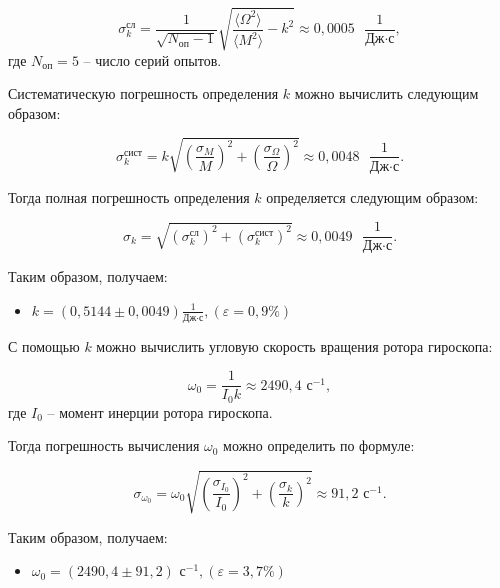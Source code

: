\documentclass[a4paper,12pt]{article} %
\begin{document}
\begin{equation}
\sigma^\text{сл}_k = \frac{1}{\sqrt{N_\text{оп}-1}} \sqrt{\frac{\langle \Omega^2 \rangle}{\langle M^2 \rangle} - k^2} \approx 0,0005 \text{ } \frac{1}{\text{Дж} \cdot \text{с}},
\end{equation}
где $ N_\text{оп} = 5 $ -- число серий опытов.

Систематическую погрешность определения $ k $ можно вычислить следующим образом:

\begin{equation}
\sigma^\text{сист}_k = k\sqrt{\left( \frac{\sigma_M}{M} \right)^2+\left(\frac{\sigma_\Omega}{\Omega} \right)^2} \approx 0,0048 \text{ } \frac{1}{\text{Дж} \cdot \text{с}}.
\end{equation}

Тогда полная погрешность определения $ k $ определяется следующим образом:

\begin{equation}
\sigma_k = \sqrt{\left( \sigma_k^\text{сл} \right)^2 + \left( \sigma_k^\text{сист} \right)^2  } \approx 0,0049 \text{ } \frac{1}{\text{Дж} \cdot \text{с}}.
\end{equation}

Таким образом, получаем:

\begin{itemize}
	\item \underline{$ k =\left( 0,5144 \pm 0,0049 \right) \frac{1}{\text{Дж} \cdot \text{с}} , \left( \varepsilon = 0,9 \% \right) $}
\end{itemize}

С помощью $ k $ можно вычислить угловую скорость вращения ротора гироскопа:

\begin{equation}
\omega_0 = \frac{1}{I_0 k} \approx 2490,4 \text{ с}^{-1},
\end{equation}
где $ I_0 $ -- момент инерции ротора гироскопа.

Тогда погрешность вычисления $ \omega_0 $ можно определить по формуле:

\begin{equation}
\sigma_{\omega_0} = \omega_0 \sqrt{\left( \frac{\sigma_{I_0}}{I_0} \right)^2 + \left( \frac{\sigma_k}{k} \right)^2} \approx 91,2 \text{ с}^{-1}.
\end{equation}

Таким образом, получаем:

\begin{itemize}
	\item \underline{$ \omega_0 =\left( 2490,4 \pm 91,2 \right) \text{ с}^{-1} , \left( \varepsilon = 3,7 \% \right) $}
\end{itemize}
\end{document}

